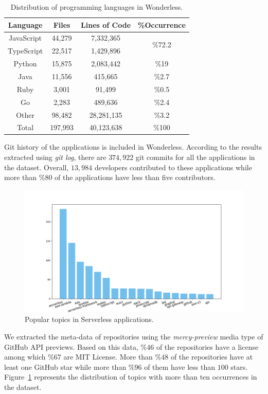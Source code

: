\vspace{-2mm}
\begin{table}[h]
	\begin{center}
		\caption{Distribution of programming languages in Wonderless.}
		\label{tab:pl}
		\begin{tabular}{c|c|c|c}
			\textbf{Language} & \textbf{Files} & \textbf{Lines of Code} & \textbf{\%Occurrence} \\
			\toprule
			JavaScript &  44,279 & 7,332,365 & \multirow{2}{*}{\%72.2} \\
			TypeScript & 22,517 & 1,429,896 &  \\ \midrule
			Python & 15,875 & 2,083,442 & \%19 \\ \midrule
			Java & 11,556 & 415,665 & \%2.7  \\ \midrule
			Ruby & 3,001 & 91,499 & \%0.5  \\ \midrule
			Go & 2,283 & 489,636 & \%2.4 \\ \midrule
			Other & 98,482 & 28,281,135 & \%3.2 \\ \midrule
			Total & 197,993 & 40,123,638 & \%100\\ \midrule
		\end{tabular}
	\end{center}
\end{table}
\vspace{-5mm}

Git history of the applications is included in Wonderless. 
According to the results extracted using \emph{git log}, there are $374,922$ git commits for all the 
applications in the dataset. Overall, $13,984$ developers contributed to these applications while 
more than $\%80$ of the applications have less than five contributors.

\begin{figure}
	\centering
	\includegraphics[scale=0.3]{figures/topics.png}
	\caption{Popular topics in Serverless applications.}
	\label{fig:topics}
\end{figure}

We extracted the meta-data of repositories using the \emph{mercy-preview} media 
type of GitHub API previews. Based on this data, $\%46$ of the repositories have a license 
among which $\%67$ are MIT License. More than $\%48$ of the repositories have at least one 
GitHub star while more than $\%96$ of them have less than $100$ stars. Figure~\ref{fig:topics} 
represents the distribution of topics with more than ten occurrences in the dataset.
